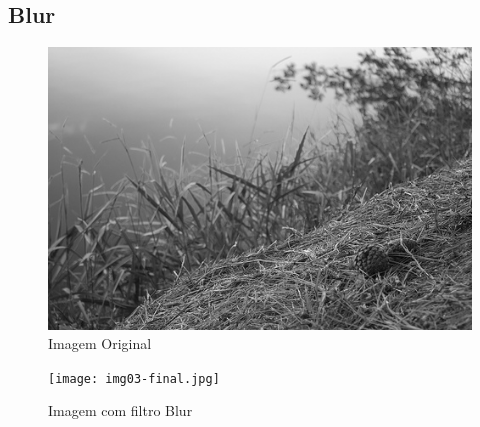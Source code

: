 \documentclass[11pt,a4paper]{article}
\begin{document}
\subsection{Blur}
\begin{figure}[!htb]
    \centering
    \includegraphics[scale=0.3]{img03.jpg}
    \caption{Imagem Original}
    \label{img3}
\end{figure}
\begin{figure}[!htb]
    \centering
    \texttt{[image: img03-final.jpg]}
    \caption{Imagem com filtro Blur}
    \label{img3-f}
\end{figure}
\end{document}
